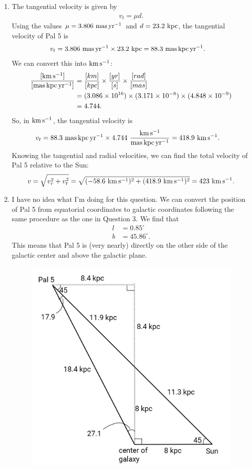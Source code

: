 \documentclass[11pt,letterpaper]{article}
\begin{document}
\begin{enumerate}[label=(\alph*)]
        \item The tangential velocity is given by 
        \begin{align*}
            v_t = \mu d.
        \end{align*}
        Using the values $\mu = 3.806~{\rm mas\,yr^{-1}}$ and $d=23.2~{\rm kpc}$, the tangential velocity of Pal 5 is 
        \begin{align*}
            v_t &= 3.806~{\rm mas\,yr^{-1}}\times 23.2~{\rm kpc} = 88.3~{\rm mas\,kpc\,yr^{-1}}.
        \end{align*}
        We can convert this into $\rm km\,s^{-1}$:
        \begin{align*}
            \rm \frac{[km\,s^{-1}]}{[mas\,kpc\,yr^{-1}]} &= \frac{[km]}{[kpc]}\times\frac{[yr]}{[s]}\times\frac{[rad]}{[mas]} \\
            &= (3.086\times 10^{16})\times (3.171\times 10^{-8})\times (4.848\times 10^{-9}) \\
            &= 4.744.
        \end{align*}
        So, in $\rm km\,s^{-1}$, the tangential velocity is
        \begin{align*}
            v_t &= 88.3~{\rm mas\,kpc\,yr^{-1}} \times 4.744~{\rm \frac{km\,s^{-1}}{mas\,kpc\,yr^{-1}}} = 418.9~{\rm km\,s^{-1}}.
        \end{align*}
        Knowing the tangential and radial velocities, we can find the total velocity of Pal 5 relative to the Sun: 
        \begin{align*}
            v = \sqrt{v_r^2 + v_t^2} = \sqrt{(-58.6~{\rm km\,s^{-1}})^2 + (418.9~{\rm km\,s^{-1}})^2} = 423~{\rm km\,s^{-1}}.
        \end{align*}
    \item I have no idea what I'm doing for this question. We can convert the position of Pal 5 from equatorial coordinates to galactic coordinates following the same procedure as the one in Question 3. We find that 
        \begin{align*}
            l &= 0.85^\circ \\
            b &= 45.86^\circ.
        \end{align*}
    This means that Pal 5 is (very nearly) directly on the other side of the galactic center and above the galactic plane.
    \begin{figure}[!htb]
        \centering
        \includegraphics[width=0.4\linewidth]{trig.png}

\end{figure}
\end{enumerate}
\end{document}

